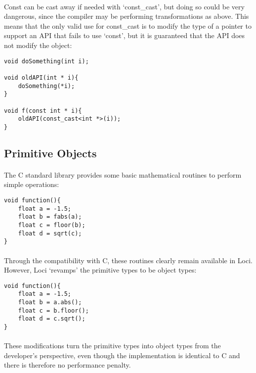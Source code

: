 \documentclass[12pt,twoside,notitlepage]{report}
\begin{document}
\paragraph{}
Const can be cast away if needed with `const\_cast', but doing so could be very dangerous, since the compiler may be performing transformations as above. This means that the only valid use for const\_cast is to modify the type of a pointer to support an API that fails to use `const', but it is guaranteed that the API does not modify the object:

\begin{lstlisting}
void doSomething(int i);

void oldAPI(int * i){
	doSomething(*i);
}

void f(const int * i){
	oldAPI(const_cast<int *>(i));
}
\end{lstlisting}

\clearpage

\subsection{Primitive Objects}

\paragraph{}
The C standard library provides some basic mathematical routines to perform simple operations:


\begin{lstlisting}
void function(){
	float a = -1.5;
	float b = fabs(a);
	float c = floor(b);
	float d = sqrt(c);
}
\end{lstlisting}


\paragraph{}
Through the compatibility with C, these routines clearly remain available in Loci. However, Loci `revamps' the primitive types to be object types:


\begin{lstlisting}
void function(){
	float a = -1.5;
	float b = a.abs();
	float c = b.floor();
	float d = c.sqrt();
}
\end{lstlisting}


\paragraph{}
These modifications turn the primitive types into object types from the developer's perspective, even though the implementation is identical to C and there is therefore no performance penalty.
\end{document}

